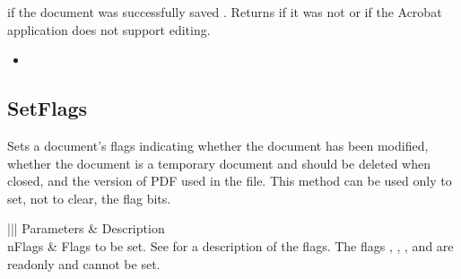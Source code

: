 \documentclass[letterpaper,12pt,english,openany,oneside]{sphinxmanual}
\begin{document}
 if the document was successfully saved . Returns  if it was not or if the Acrobat application does not support editing.

\label{\detokenize{IAC_API_OLE_Objects:related-methods-108}}
\begin{itemize}
\item {} 
 

\end{itemize}




\subsection{SetFlags}
\label{\detokenize{IAC_API_OLE_Objects:setflags}}
Sets a document’s flags indicating whether the document has been modified, whether the document is a temporary document and should be deleted when closed, and the version of PDF used in the file. This method can be used only to set, not to clear, the flag bits.


\begin{sphinxVerbatim}[commandchars=\\\{\}]
  
\end{sphinxVerbatim}
\label{\detokenize{IAC_API_OLE_Objects:parameters-64}}


\begin{savenotes}\sphinxattablestart
\centering
{}\label{\detokenize{IAC_API_OLE_Objects:section-72}}\nobreak
\begin{tabular}[t]{|||}
\hline
\sphinxstyletheadfamily 
Parameters
&\sphinxstyletheadfamily 
Description
\\
\hline
nFlags
&
Flags to be set. See   for a description of the flags. The flags  ,  ,  , and  are read\sphinxhyphen{}only and cannot be set.
\\
\hline
\end{tabular}
\par
\sphinxattableend\end{savenotes}
\end{document}
